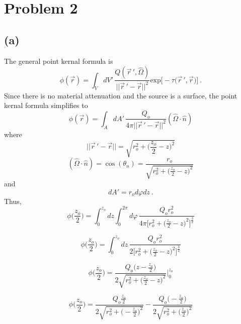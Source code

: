 \documentclass{article}
\begin{document}
\pagebreak

\section*{Problem 2}
\subsection*{(a)}

The general point kernal formula is 
\begin{equation*}
\phi(\vec{r}) = \int_V dV' \, \frac{Q(\vec{r}\,',\hat{\Omega})}{||\vec{r}\,'-\vec{r}||^2} \text{exp} \Big[ - \tau \big(\vec{r}\,', \vec{r} \big) \Big] \: .
\end{equation*}
Since there is no material attenuation and the source is a surface, the point kernal formula simplifies to  
\begin{equation}
\phi(\vec{r}) = \int_A dA' \, \frac{Q_o}{4 \pi ||\vec{r}\,'-\vec{r}||^2} (\hat{\Omega} \cdot \hat{n})
\end{equation}
where 
\begin{equation*}
||\vec{r}\,'-\vec{r}|| =  \sqrt{  r_o^2 + \big(\frac{z_o}{2} -z \big)^2 } 
\end{equation*}
\begin{equation*}
(\hat{\Omega} \cdot \hat{n}) = \cos(\theta_n) = \frac{r_o}{\sqrt{ r_o^2 + \big(\frac{z_o}{2} -z \big)^2 } }
\end{equation*}
and
\begin{equation*}
dA' = r_o d\varphi dz \: .
\end{equation*}
Thus,
\begin{equation*}
\phi\Big(\frac{z_o}{2}\Big) =\int_0^{z_o} dz \int_0^{2\pi} d\varphi \, \frac{Q_o r_o^2}{4 \pi \Big[ r_o^2 + \big(\frac{z_o}{2}-z\big)^2 \Big]^{\frac{3}{2}}} 
\end{equation*}

\begin{equation*}
\phi\Big(\frac{z_o}{2}\Big) =\int_0^{z_o} dz  \, \frac{Q_o r_o^2}{2 \Big[ r_o^2 + \big(\frac{z_o}{2}-z\big)^2 \Big]^{\frac{3}{2}}} 
\end{equation*}

\begin{equation*}
\phi\Big(\frac{z_o}{2}\Big) = \frac{Q_o \big(z-\frac{z_o}{2}\big)}{2 \sqrt{ r_o^2 + \big(\frac{z_o}{2}-z\big)^2 }} \Big|_0^{z_o}
\end{equation*}

\begin{equation*}
\phi\Big(\frac{z_o}{2}\Big) = \frac{Q_o \frac{z_o}{2}}{2 \sqrt{ r_o^2 + \big(-\frac{z_o}{2}\big)^2 }} - \frac{Q_o \big(- \frac{z_o}{2}\big)}{2 \sqrt{ r_o^2 + \big(\frac{z_o}{2}\big)^2 }} 
\end{equation*}
\end{document}
